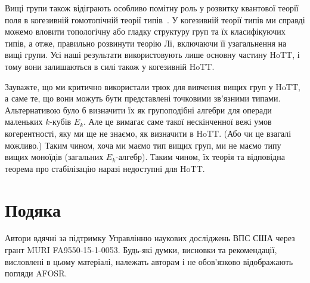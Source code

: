 \documentclass[12pt]{article}
\begin{document}
Вищі групи також відіграють особливо помітну роль у розвитку квантової теорії поля в когезивній гомотопічній теорії типів~\cite{ShreiberShulman}. У когезивній теорії типів ми справді можемо вловити топологічну або гладку структуру груп та їх класифікуючих типів, а отже, правильно розвинути теорію Лі, включаючи її узагальнення на вищі групи. Усі наші результати використовують лише основну частину HoTT, і тому вони залишаються в силі також у когезивній HoTT.

Зауважте, що ми критично використали трюк для вивчення вищих груп у HoTT, а саме те, що вони можуть бути представлені точковими зв'язними типами. Альтернативою було б визначити їх як групоподібні алгебри для операди маленьких $k$-кубів $E_k$. Але це вимагає саме такої нескінченної вежі умов когерентності, яку ми ще не знаємо, як визначити в HoTT. (Або чи це взагалі можливо.) Таким чином, хоча ми маємо тип вищих груп, ми не маємо типу вищих моноїдів (загальних $E_k$-алгебр). Таким чином, їх теорія та відповідна теорема про стабілізацію наразі недоступні для HoTT.

\section*{Подяка}
  Автори вдячні за підтримку Управлінню наукових досліджень ВПС США через грант MURI FA9550-15-1-0053. Будь-які думки, висновки та рекомендації, висловлені в цьому матеріалі, належать авторам і не обов'язково відображають погляди AFOSR.
\end{document}
